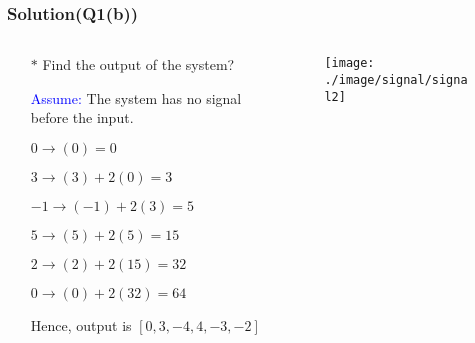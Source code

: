 \documentclass{beamer}
\newcommand{\blue}[1]{\textcolor{blue}{#1}}
\begin{document}
\begin{frame}
\frametitle{Solution(Q1(b))}


\begin{columns}
\begin{column}{6.8 cm}
\begin{itemize} \itemsep1pt \parskip0pt 
  \item[$\ast$] Find the output of the system?
\end{itemize}

\vspace{6 mm}
\begin{itemize} \itemsep1pt \parskip0pt 
  \item[] \blue{Assume:} The system has no signal before the input.
  \item[] \hspace{5 mm}$0 \rightarrow $\hspace{5 mm}$(0) $\hspace{20 mm}$= 0$
  \item[] \hspace{5 mm}$3 \rightarrow $\hspace{5 mm}$(3) + 2(0) $\hspace{8.5 mm}$= 3$
  \item[] \hspace{2 mm}$-1 \rightarrow $\hspace{2 mm}$(-1) + 2(3) $\hspace{8.5 mm}$= 5$
  \item[] \hspace{5 mm}$5 \rightarrow $\hspace{5 mm}$(5) + 2(5) $\hspace{8.3 mm}$= 15$
  \item[] \hspace{5 mm}$2 \rightarrow $\hspace{5 mm}$(2) + 2(15) $\hspace{6.5 mm}$= 32$
  \item[] \hspace{5 mm}$0 \rightarrow $\hspace{5 mm}$(0) + 2(32) $\hspace{6.5 mm}$= 64$
  \item[] Hence, output is $[0,3,-4,4,-3,-2]$
\end{itemize}
\end{column}



\begin{column}{6 cm}
\begin{figure}[H]
  \texttt{[image: ./image/signal/signal2]}
\end{figure}



\end{column}
\end{columns}
\end{frame}
\end{document}
